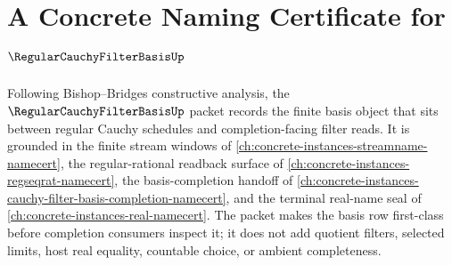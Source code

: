 \chapter{A Concrete Naming Certificate for $\RegularCauchyFilterBasisUp$}
\label{ch:concrete-instances-regular-cauchy-filter-basis-namecert}

Following Bishop--Bridges constructive analysis, the $\RegularCauchyFilterBasisUp$ packet records the finite basis object that sits between regular Cauchy schedules and completion-facing filter reads. It is grounded in the finite stream windows of \autoref{ch:concrete-instances-streamname-namecert}, the regular-rational readback surface of \autoref{ch:concrete-instances-regseqrat-namecert}, the basis-completion handoff of \autoref{ch:concrete-instances-cauchy-filter-basis-completion-namecert}, and the terminal real-name seal of \autoref{ch:concrete-instances-real-namecert}. The packet makes the basis row first-class before completion consumers inspect it; it does not add quotient filters, selected limits, host real equality, countable choice, or ambient completeness.

